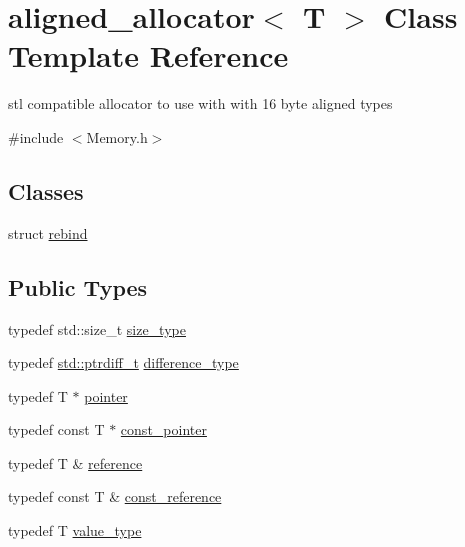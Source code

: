 \hypertarget{classaligned__allocator}{\section{aligned\-\_\-allocator$<$ T $>$ Class Template Reference}
\label{classaligned__allocator}
}


stl compatible allocator to use with with 16 byte aligned types  




{\ttfamily \#include $<$Memory.\-h$>$}

\subsection*{Classes}
\begin{DoxyCompactItemize}
\item 
struct \hyperlink{structaligned__allocator_1_1rebind}{rebind}
\end{DoxyCompactItemize}
\subsection*{Public Types}
\begin{DoxyCompactItemize}
\item 
typedef std\-::size\-\_\-t \hyperlink{classaligned__allocator_a8546aec5c19297c6a68abc86ee5ef728}{size\-\_\-type}
\item 
typedef \hyperlink{zutil_8h_afbe679a40a36da5983ebc5b39754c065}{std\-::ptrdiff\-\_\-t} \hyperlink{classaligned__allocator_a0611a3b4581a17616eaaf9f0d5b27cbb}{difference\-\_\-type}
\item 
typedef T $\ast$ \hyperlink{classaligned__allocator_a6594075542435bfbdd8e96e197b12ab7}{pointer}
\item 
typedef const T $\ast$ \hyperlink{classaligned__allocator_aee8cbc399662a1e70c84c39f8069e838}{const\-\_\-pointer}
\item 
typedef T \& \hyperlink{classaligned__allocator_a631a9ed77fe18361d10e8a50ab6d6230}{reference}
\item 
typedef const T \& \hyperlink{classaligned__allocator_ae809f97ebe11807c77db507b9ae93afc}{const\-\_\-reference}
\item 
typedef T \hyperlink{classaligned__allocator_ad54ae81077219c954d5f2319052af2b2}{value\-\_\-type}
\end{DoxyCompactItemize}
